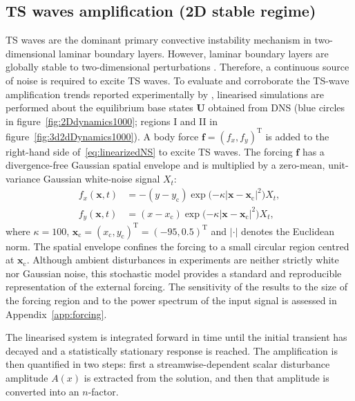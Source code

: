 \documentclass[lineno]{jfm}
\begin{document}
\subsection{\ac{TS} waves amplification (2D stable regime)}\label{sec:2Dstable}
\ac{TS} waves are the dominant primary convective instability mechanism in two-dimensional laminar boundary layers. However, laminar boundary layers are globally stable to two-dimensional perturbations \citep{ehrensteinGallaire2005}. Therefore, a continuous source of noise is required to excite \ac{TS} waves. To evaluate and corroborate the \ac{TS}-wave amplification trends reported experimentally by \citet{jeffGaps}, linearised simulations are performed about the equilibrium base states $\boldsymbol{U}$ obtained from \ac{DNS} (blue circles in figure~\ref{fig:2Ddynamics1000}; regions I and II in figure~\ref{fig:3d2dDynamics1000}). A body force $\boldsymbol{f}={(f_x,f_y)}^\mathrm{T}$ is added to the right-hand side of~\eqref{eq:linearizedNS} to excite \ac{TS} waves. The forcing $\boldsymbol{f}$ has a divergence-free Gaussian spatial envelope and is multiplied by a zero-mean, unit-variance Gaussian white-noise signal $X_t$:
\begin{align}
	f_x(\boldsymbol{x},t) & = -(y-y_{\mathrm{c}}) \exp\big({-\kappa{|\boldsymbol{x}-\boldsymbol{x}_{\mathrm{c}}|}^2}\big) X_t, \\
	f_y(\boldsymbol{x},t) & = (x-x_{\mathrm{c}}) \exp\big({-\kappa{|\boldsymbol{x}-\boldsymbol{x}_{\mathrm{c}}|}^2}\big) X_t,
\end{align}
where $\kappa = 100$, $\boldsymbol{x}_{\mathrm{c}} ={(x_{\mathrm{c}},y_{\mathrm{c}})}^\mathrm{T} = {(-95, 0.5)}^\mathrm{T}$ and $|\cdot|$ denotes the Euclidean norm. The spatial envelope confines the forcing to a small circular region centred at $\boldsymbol{x}_{\mathrm{c}}$. Although ambient disturbances in experiments are neither strictly white nor Gaussian noise, this stochastic model provides a standard and reproducible representation of the external forcing. The sensitivity of the results to the size of the forcing region and to the power spectrum of the input signal is assessed in Appendix~\ref{app:forcing}.

The linearised system is integrated forward in time until the initial transient has decayed and a statistically stationary response is reached. The amplification is then quantified in two steps: first a streamwise-dependent scalar disturbance amplitude $A(x)$ is extracted from the solution, and then that amplitude is converted into an $n$-factor.
\end{document}
